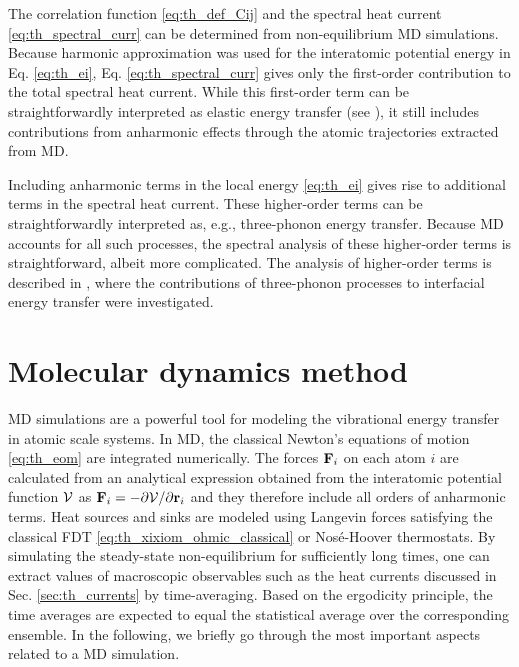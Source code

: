 The correlation function \eqref{eq:th_def_Cij} and the spectral heat current \eqref{eq:th_spectral_curr} can be determined from non-equilibrium MD simulations. Because harmonic approximation was used for the interatomic potential energy in Eq. \eqref{eq:th_ei}, Eq. \eqref{eq:th_spectral_curr} gives only the first-order contribution to the total spectral heat current. While this first-order term can be straightforwardly interpreted as elastic energy transfer (see ), it still includes contributions from anharmonic effects through the atomic trajectories extracted from MD.

Including anharmonic terms in the local energy \eqref{eq:th_ei} gives rise to additional terms in the spectral heat current. These higher-order terms can be straightforwardly interpreted as, e.g., three-phonon energy transfer. Because MD accounts for all such processes, the spectral analysis of these higher-order terms is straightforward, albeit more complicated. The analysis of higher-order terms is described in , where the contributions of three-phonon processes to interfacial energy transfer were investigated. 

\section{Molecular dynamics method}

\label{sec:methods_md}

MD simulations are a powerful tool for modeling the vibrational energy transfer in atomic scale systems. In MD, the classical Newton's equations of motion \eqref{eq:th_eom} are integrated numerically. The forces $\mathbf{F}_i$ on each atom $i$ are calculated from an analytical expression obtained from the interatomic potential function $\mathcal{V}$ as $\mathbf{F}_i=-\partial \mathcal{V}/\partial \mathbf{r}_i$ and they therefore include all orders of anharmonic terms. Heat sources and sinks are modeled using Langevin forces satisfying the classical FDT \eqref{eq:th_xixiom_ohmic_classical} or Nos\'e-Hoover \cite{nose84,hoover85} thermostats. By simulating the steady-state non-equilibrium for sufficiently long times, one can extract values of macroscopic observables such as the heat currents discussed in Sec. \ref{sec:th_currents} by time-averaging. Based on the ergodicity principle, the time averages are expected to equal the statistical average over the corresponding ensemble. In the following, we briefly go through the most important aspects related to a MD simulation.

